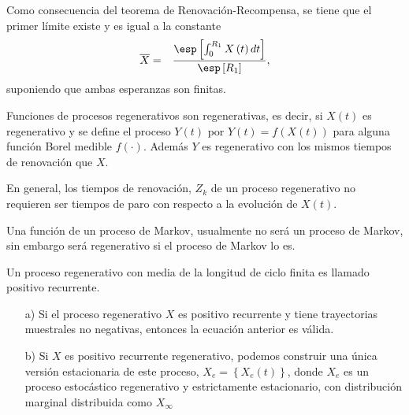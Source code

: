 Como consecuencia del teorema de Renovaci\'on-Recompensa, se tiene que el primer l\'imite  existe y es igual a la constante
\begin{eqnarray*}
\overline{X}&=&\frac{\esp\left[\int_{0}^{R_{1}}X\left(t\right)dt\right]}{\esp\left[R_{1}\right]},
\end{eqnarray*}
suponiendo que ambas esperanzas son finitas.
 
\begin{Note}
Funciones de procesos regenerativos son regenerativas, es decir, si $X\left(t\right)$ es regenerativo y se define el proceso $Y\left(t\right)$ por $Y\left(t\right)=f\left(X\left(t\right)\right)$ para alguna funci\'on Borel medible $f\left(\cdot\right)$. Adem\'as $Y$ es regenerativo con los mismos tiempos de renovaci\'on que $X$. 

En general, los tiempos de renovaci\'on, $Z_{k}$ de un proceso regenerativo no requieren ser tiempos de paro con respecto a la evoluci\'on de $X\left(t\right)$.
\end{Note} 

\begin{Note}
Una funci\'on de un proceso de Markov, usualmente no ser\'a un proceso de Markov, sin embargo ser\'a regenerativo si el proceso de Markov lo es.
\end{Note}

 
\begin{Note}
Un proceso regenerativo con media de la longitud de ciclo finita es llamado positivo recurrente.
\end{Note}


\begin{Note}
\begin{itemize}
\item[a)] Si el proceso regenerativo $X$ es positivo recurrente y tiene trayectorias muestrales no negativas, entonces la ecuaci\'on anterior es v\'alida.
\item[b)] Si $X$ es positivo recurrente regenerativo, podemos construir una \'unica versi\'on estacionaria de este proceso, $X_{e}=\left\{X_{e}\left(t\right)\right\}$, donde $X_{e}$ es un proceso estoc\'astico regenerativo y estrictamente estacionario, con distribuci\'on marginal distribuida como $X_{\infty}$
\end{itemize}
\end{Note}




